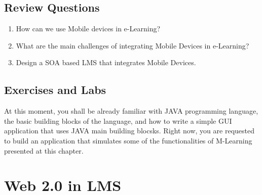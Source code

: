 \documentclass[12pt,a4paper,final,twoside,onecolumn,titlepage]{book}
\begin{document}
\section{Review Questions}
\begin{enumerate}
\item How can we use Mobile devices in e-Learning?
\item What are the main challenges of integrating Mobile Devices in e-Learning?
\item Design a \gls{SOA} based \gls{LMS} that integrates Mobile Devices.
\end{enumerate}

\section{Exercises and Labs}
At this moment, you shall be already familiar with JAVA programming language, the basic building blocks of the language, and how to write a simple GUI application that uses JAVA main building blocsks. Right now, you are requested to build an application that simulates some of the functionalities of M-Learning presented at this chapter.

\chapter{Web 2.0 in LMS}
\label{Web2.0InLMS}
\end{document}
